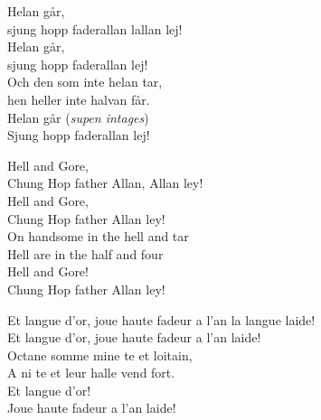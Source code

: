 \documentclass[a6paper, 10pt, twoside]{article}
\begin{document}
\small

\noindent
\begin{center}
\end{center}
\begin{lyrics}
Helan går, \\
sjung hopp faderallan lallan lej! \\
Helan går, \\
sjung hopp faderallan lej! 
\vspace{5pt} \\
Och den som inte helan tar, \\
hen heller inte halvan får. \\
Helan går (\textit{supen intages})\\
Sjung hopp faderallan lej! 
\end{lyrics}
\begin{center}
\end{center}
\begin{lyrics}
Hell and Gore, \\
Chung Hop father Allan, Allan ley! \\
Hell and Gore, \\
Chung Hop father Allan ley!
\vspace{5pt} \\
On handsome in the hell and tar \\
Hell are in the half and four \\
Hell and Gore! \\
Chung Hop father Allan ley! 
\end{lyrics}
\begin{center}
\end{center}
\begin{lyrics}
Et langue d'or, joue haute fadeur a l'an la langue laide! \\
Et langue d'or, joue haute fadeur a l'an laide! \\
Octane somme mine te et loitain, \\
A ni te et leur halle vend fort. \\
Et langue d'or! \\
Joue haute fadeur a l'an laide! 
\end{lyrics}
\end{document}
